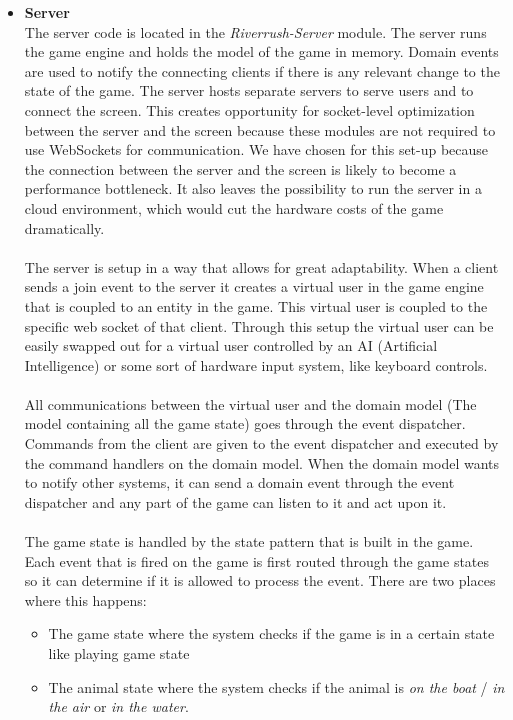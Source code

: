 \documentclass[11pt,a4paper]{article}
\begin{document}
\begin{itemize}
\item \textbf{Server} \\
The server code is located in the \emph{Riverrush-Server} module. The server runs the game engine and holds the model of the game in memory. Domain events are used to notify the connecting clients if there is any relevant change to the state of the game. The server hosts separate servers to serve users and to connect the screen. This creates opportunity for socket-level optimization between the server and the screen because these modules are not required to use WebSockets for communication. We have chosen for this set-up because the connection between the server and the screen is likely to become a performance bottleneck. It also leaves the possibility to run the server in a cloud environment, which would cut the hardware costs of the game dramatically.\\
\\
The server is setup in a way that allows for great adaptability. When a client sends a join event to the server it creates a virtual user in the game engine that is coupled to an entity in the game. This virtual user is coupled to the specific web socket of that client. Through this setup the virtual user can be easily swapped out for a virtual user controlled by an AI (Artificial Intelligence) or some sort of hardware input system, like keyboard controls.\\
\\
All communications between the virtual user and the domain model (The model containing all the game state) goes through the event dispatcher. Commands from the client are given to the event dispatcher and executed by the command handlers on the domain model. When the domain model wants to notify other systems, it can send a domain event through the event dispatcher and any part of the game can listen to it and act upon it.\\
\\
The game state is handled by the state pattern that is built in the game. Each event that is fired on the game is first routed through the game states so it can determine if it is allowed to process the event. There are two places where this happens: 
\begin{itemize}
\item 
The game state where the system checks if the game is in a certain state like playing game state
\item
The animal state where the system checks if the animal is \emph{on the boat} / \emph{in the air} or \emph{in the water}.
\end{itemize}


\end{itemize}
\end{document}
